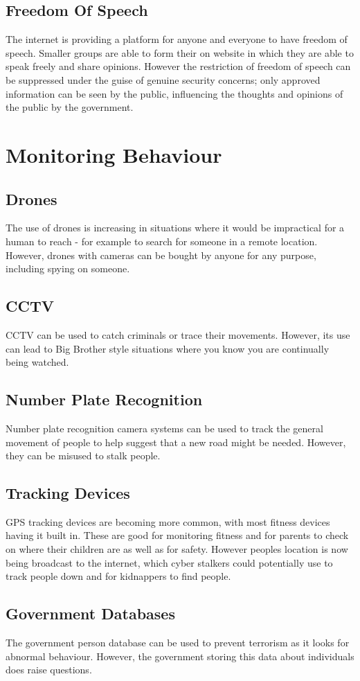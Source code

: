 \documentclass[a4paper,11pt, twocolumn]{article}
\begin{document}
\subsection{Freedom Of Speech}
The internet is providing a platform for anyone and everyone to have freedom of speech. Smaller groups are able to form their on website in which they are able to speak freely and share opinions. However the restriction of freedom of speech can be suppressed under the guise of genuine security concerns; only approved information can be seen by the public, influencing the thoughts and opinions of the public by the government.

\section{Monitoring Behaviour}
\subsection{Drones}
The use of drones is increasing in situations where it would be impractical for a human to reach - for example to search for someone in a remote location. However, drones with cameras can be bought by anyone for any purpose, including spying on someone. 
\subsection{CCTV}
CCTV can be used to catch criminals or trace their movements. However, its use can lead to Big Brother style situations where you know you are continually being watched.
\subsection{Number Plate Recognition}
Number plate recognition camera systems can be used to track the general movement of people to help suggest that a new road might be needed. However, they can be misused to stalk people.
\subsection{Tracking Devices}
GPS tracking devices are becoming more common, with most fitness devices having it built in. These are good for monitoring fitness and for parents to check on where their children are as well as for safety. However peoples location is now being broadcast to the internet, which cyber stalkers could potentially use to track people down and for kidnappers to find people. 
\subsection{Government Databases}
The government person database can be used to prevent terrorism as it looks for abnormal behaviour. However, the government storing this data about individuals does raise questions.
\end{document}
